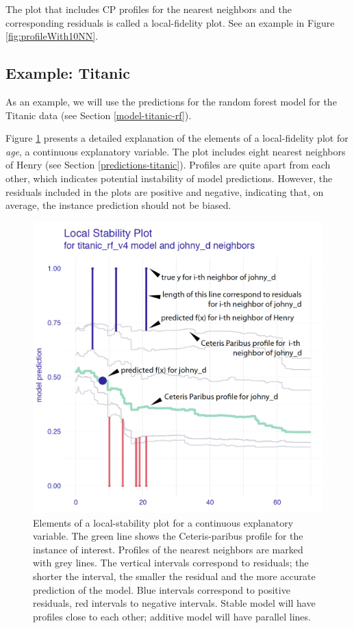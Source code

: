 \documentclass[12pt,]{krantz}
\begin{document}
The plot that includes CP profiles for the nearest neighbors and the corresponding residuals is called a local-fidelity plot. See an example in Figure \ref{fig:profileWith10NN}.

\hypertarget{cPLocDiagExample}{%
\subsection{Example: Titanic}\label{cPLocDiagExample}}

As an example, we will use the predictions for the random forest model for the Titanic data (see Section \ref{model-titanic-rf}).

Figure \ref{fig:localFidelityPlots} presents a detailed explanation of the elements of a local-fidelity plot for \emph{age}, a continuous explanatory variable. The plot includes eight nearest neighbors of Henry (see Section \ref{predictions-titanic}). Profiles are quite apart from each other, which indicates potential instability of model predictions. However, the residuals included in the plots are positive and negative, indicating that, on average, the instance prediction should not be biased.

\begin{figure}

{\centering \includegraphics[width=0.7\linewidth]{figure/localFidelityPlots} 

}

\caption{Elements of a local-stability plot for a continuous explanatory variable. The green line shows the Ceteris-paribus profile for the instance of interest. Profiles of the nearest neighbors are marked with grey lines. The vertical intervals correspond to residuals; the shorter the interval, the smaller the residual and the more accurate prediction of the model. Blue intervals correspond to positive residuals, red intervals to negative intervals. Stable model will have profiles close to each other; additive model will have parallel lines.}\label{fig:localFidelityPlots}
\end{figure}
\end{document}
